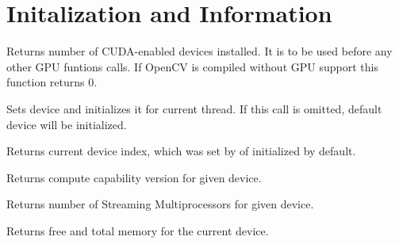 \section{Initalization and Information}


Returns number of CUDA-enabled devices installed. It is to be used before any other GPU funtions calls. If OpenCV is compiled without GPU support this function returns 0. 



Sets device and initializes it for current thread. If this call is omitted, default device will be initialized.

\begin{description}
\end{description}


Returns current device index, which was set by  of initialized by default.



Returns compute capability version for given device.

\begin{description}
\end{description}

Returns number of Streaming Multiprocessors for given device.

\begin{description}
\end{description}


Returns free and total memory for the current device.

\begin{description}
\end{description}


